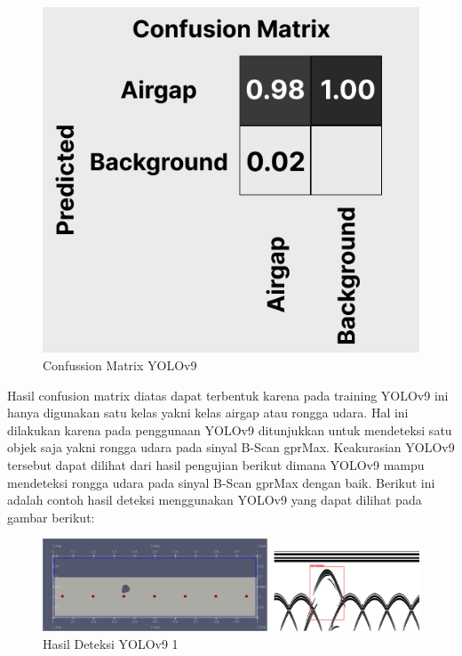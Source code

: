 \begin{figure} [H] \centering
    \includegraphics[scale=0.1]{gambar/bab4/conyolotrain.png}
    \caption{Confussion Matrix YOLOv9}
    \label{fig:conyolotrain}
\end{figure}

Hasil confusion matrix diatas dapat terbentuk karena pada training YOLOv9 ini hanya digunakan satu kelas yakni kelas airgap atau rongga udara. Hal ini dilakukan karena pada penggunaan YOLOv9 ditunjukkan untuk mendeteksi satu objek saja yakni rongga udara pada sinyal B-Scan gprMax. Keakurasian YOLOv9 tersebut dapat dilihat dari hasil pengujian berikut dimana YOLOv9 mampu mendeteksi rongga udara pada sinyal B-Scan gprMax dengan baik. Berikut ini adalah contoh hasil deteksi menggunakan YOLOv9 yang dapat dilihat pada gambar berikut:

\begin{figure} [H] \centering
    \includegraphics[scale=0.2]{gambar/bab4/yolo1.png}
    \caption{Hasil Deteksi YOLOv9 1}
\end{figure}

